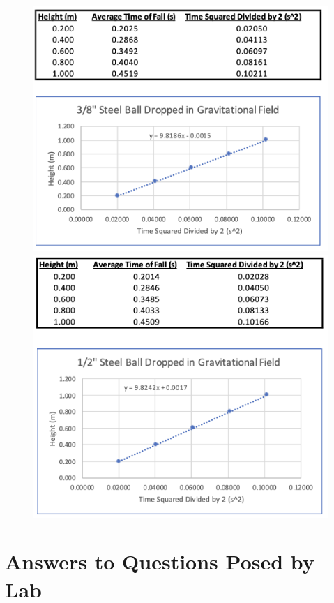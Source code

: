 \begin{figure}[!h]
    \centering
    \includegraphics[scale=0.55]{resources/GraphSmall.png}
    \includegraphics[scale=0.55]{resources/GraphLarge.png}
\end{figure}

\newpage

\section{Answers to Questions Posed by Lab}

